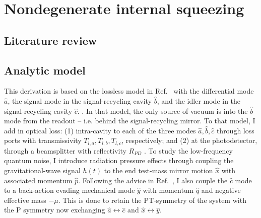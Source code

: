 \chapter{Nondegenerate internal squeezing}

\section{Literature review}



\section{Analytic model}

This derivation is based on the lossless model in Ref.~\cite{liBroadbandSensitivityImprovement2020} with the differential mode $\hat{a}$, the signal mode in the signal-recycling cavity $\hat{b}$, and the idler mode in the signal-recycling cavity $\hat{c}$. . In that model, the only source of vacuum is into the $\hat{b}$ mode from the readout -- i.e. behind the signal-recycling mirror.
To that model, I add in optical loss: (1) intra-cavity to each of the three modes $\hat{a}, \hat{b}, \hat{c}$ through loss ports  with transmissivity $T_{l,a}, T_{l,b}, T_{l,c}$, respectively; and (2) at the photodetector, through a beamsplitter with reflectivity $R_{PD}$ .
To study the low-frequency quantum noise, I introduce radiation pressure effects through coupling the gravitational-wave signal $h(t)$ to the end test-mass mirror motion $\hat{x}$ with associated momentum $\hat{p}$.
Following the advice  in Ref.~\cite{liBroadbandSensitivityImprovement2020}, I also couple the $\hat{c}$ mode to a back-action evading mechanical mode $\hat{y}$ with momentum $\hat{q}$ and negative effective mass $-\mu$. This is done to retain the PT-symmetry of the system with the P symmetry now exchanging $\hat{a}\leftrightarrow\hat{c}$ and $\hat{x}\leftrightarrow\hat{y}$.


